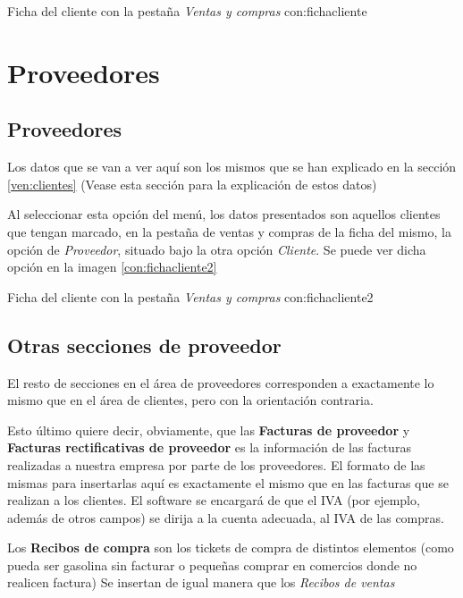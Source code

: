 {Ficha del cliente con la pestaña \emph{Ventas y compras}}
{con:fichacliente}











\section{Proveedores}

\subsection{Proveedores}
Los datos que se van a ver aquí son los mismos que se han explicado en la sección \ref{ven:clientes} (Vease esta sección para la explicación de estos datos)

Al seleccionar esta opción del menú, los datos presentados son aquellos clientes que tengan marcado, en la pestaña de ventas y compras de  la ficha del mismo, la opción de \emph{Proveedor}, situado bajo la otra opción \emph{Cliente}. Se puede ver dicha opción en la imagen \ref{con:fichacliente2}

{Ficha del cliente con la pestaña \emph{Ventas y compras}}
{con:fichacliente2}


\subsection{Otras secciones de proveedor}

El resto de secciones en el área de proveedores corresponden a exactamente lo mismo que en el área de clientes, pero con la orientación contraria. 

Esto último quiere decir, obviamente, que las \textbf{Facturas de proveedor} y \textbf{Facturas rectificativas de proveedor} es la información de las facturas realizadas a nuestra empresa por parte de los proveedores. El formato de las mismas para insertarlas aquí es exactamente el mismo que en las facturas que se realizan a los clientes. El software se encargará de que el IVA (por ejemplo, además de otros campos) se dirija a la cuenta adecuada, al IVA de las compras.

Los \textbf{Recibos de compra} son los tickets de compra de distintos elementos (como pueda ser gasolina sin facturar o pequeñas comprar en comercios donde no realicen factura) Se insertan de igual manera que los \emph{Recibos de ventas}

